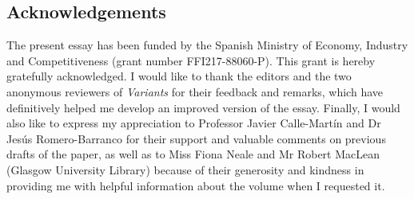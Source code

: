 \begin{paper}
\section*{Acknowledgements}
The present essay has
  been funded by the Spanish Ministry of Economy, Industry and
  Competitiveness (grant number FFI217-88060-P). This grant is hereby
  gratefully acknowledged. I would like to thank the editors and the two
  anonymous reviewers of \emph{Variants} for their feedback and remarks,
  which have definitively helped me develop an improved version of the
  essay. Finally, I would also like to express my appreciation to Professor
  Javier Calle-Martín and Dr Jesús Romero-Barranco for their support and valuable
  comments on previous drafts of the paper, as well as to Miss Fiona
  Neale and Mr Robert MacLean (Glasgow University Library) because of
  their generosity and kindness in providing me with helpful information
  about the volume when I requested it.
  
\begin{flushleft}
    \renewcommand*{\mkbibnamefamily}[1]{\textsc{#1}}
    \renewcommand*{\mkbibnamegiven}[1]{\textsc{#1}} 
\printbibliography
\end{flushleft}

\end{paper}